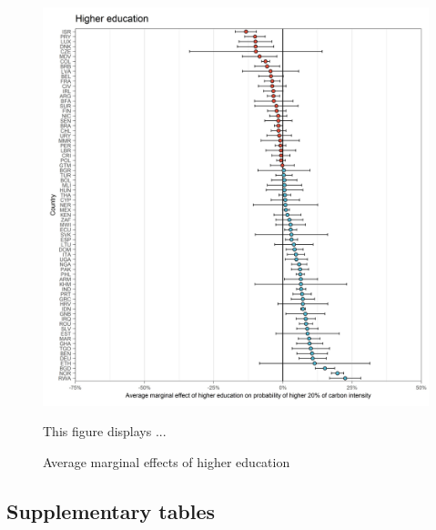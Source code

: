 \documentclass[12pt, a4paper]{article}
\newenvironment{subcaption}
{\strut
\vspace{-5pt}
\begin{minipage}[b]{0.9\textwidth}
  \hspace*{-\parindent}
  \footnotesize}
 {\end{minipage}}
\begin{document}
 \begin{figure}[ht!]
   \centering
   \caption{Average marginal effects of higher education} \label{fig:F11_high_edu}
   \includegraphics{Analysis_Logit_Models_Marginal_Effects/Average_Marginal_Effects_affected_upper_80_higher_education}
   \begin{subcaption}
     This figure displays ...
   \end{subcaption}
 \end{figure}

 \clearpage

\subsection{Supplementary tables} \label{sec:tables}

 \label{tab:A_1}

\clearpage

 \label{tab:A_2}

\clearpage

 \label{tab:A3}

\clearpage

 \label{tab:A4_CF}
\end{document}
